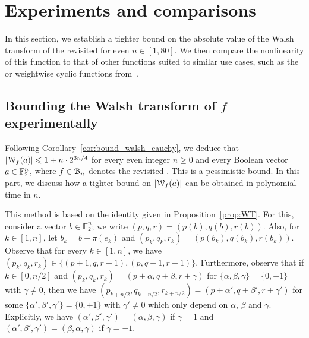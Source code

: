 \documentclass[11pt]{llncs}
\begin{document}
\section{Experiments and comparisons}\label{sec:expAndComp}


In this section, we establish a tighter bound on the absolute value of the Walsh transform of the revisited \hwbf{} for even $n\in[1,80]$. 
We then compare the nonlinearity of this function to that of other functions suited to similar use cases, such as the \hwbf{} or weightwise cyclic functions from~\cite{DAM:MeaOza24}.

\subsection{Bounding the Walsh transform of $f$ experimentally}\label{sec:expwt}


Following Corollary~\ref{cor:bound_walsh_cauchy}, we deduce that $|\mathcal W_{f}(a)|\leqslant 1+n\cdot 2^{3n/4}$ for every even integer $n\geq 0$ and every Boolean vector $a\in\mathbb{F}_2^n$, where $f\in\mathcal{B}_n$ denotes the revisited \hwbf{}. This is a pessimistic bound. In this part, we discuss how a tighter bound on $|\mathcal W_{f}(a)|$ can be obtained in polynomial time in $n$.

This method is based on the identity given in Proposition~\ref{prop:WT}.
For this, consider a vector $b\in\mathbb F_2^n$; we write $(p,q,r)=(p(b),q(b),r(b))$. Also, for $k\in[1,n]$, let $b_k=b+\pi(e_k)$ and $(p_k,q_k,r_k)=(p(b_k),q(b_k),r(b_k))$. Observe that for every $k\in[1,n]$, we have $(p_k,q_k,r_k)\in\{(p\pm1,q,r\mp 1),(p,q\pm 1,r\mp 1)\}$. Furthermore, observe that if $k\in[0,n/2]$ and $(p_k,q_k,r_k)=(p+\alpha,q+\beta,r+\gamma)$ for $\{\alpha,\beta,\gamma\}=\{0,\pm 1\}$ with $\gamma\neq 0$, then we have $(p_{k+n/2},q_{k+n/2},r_{k+n/2})=(p+\alpha',q+\beta',r+\gamma')$ for some $\{\alpha',\beta',\gamma'\}=\{0,\pm 1\}$ with $\gamma'\neq 0$ which only depend on $\alpha$, $\beta$ and $\gamma$. Explicitly, we have $(\alpha',\beta',\gamma')=(\alpha,\beta,\gamma)$ if $\gamma=1$ and $(\alpha',\beta',\gamma')=(\beta,\alpha,\gamma)$ if $\gamma=-1$.
\end{document}
